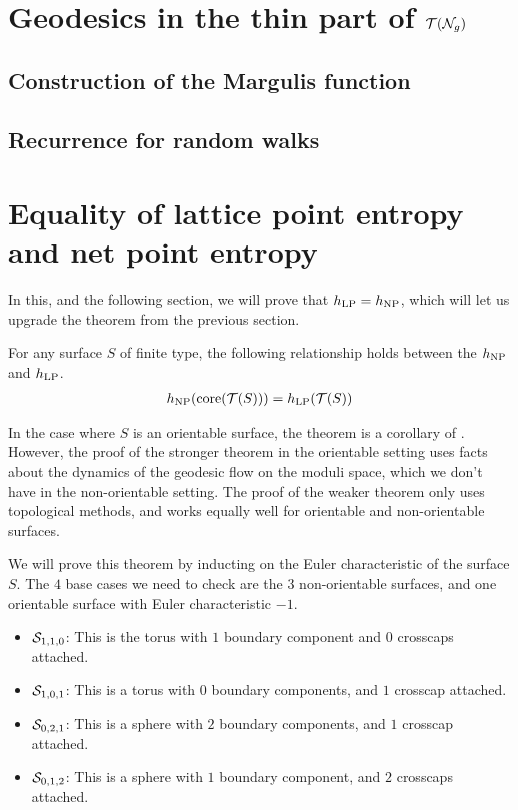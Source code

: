 \documentclass[12pt, reqno]{amsart}
\begin{document}
\section{Geodesics in the thin part of $\mathcal{T}(\mathcal{N}_g)$}
\label{sec:recurr-rand-walks}


\subsection{Construction of the Margulis function}
\label{sec:constr-marg-funct}

\subsection{Recurrence for random walks}
\label{sec:recurr-rand-walks-1}

\section{Equality of lattice point entropy and net point entropy}
\label{sec:equal-latt-point}


In this, and the following section, we will prove that $h_{\mathrm{LP}} = h_{\mathrm{NP}}$, which will let us upgrade the {\color{red} theorem from the previous section}.
\begin{theorem}
  \label{thm:entropy-equality}
  For any surface $S$ of finite type, the following relationship holds between the $h_{\mathrm{NP}}$ and $h_{\mathrm{LP}}$.
  \begin{align*}
    h_{\mathrm{NP}}(\mathrm{core}(\mathcal{T}(S))) = h_{\mathrm{LP}}(\mathcal{T}(S))
  \end{align*}
\end{theorem}

\begin{rem}
  In the case where $S$ is an orientable surface, the theorem is a corollary of \textcite[Theorem 1.2]{10.1215/00127094-1548443}.
  However, the proof of the stronger theorem in the orientable setting uses facts about the dynamics of the geodesic flow on the moduli space, which we don't have in the non-orientable setting.
  The proof of the weaker theorem only uses topological methods, and works equally well for orientable and non-orientable surfaces.
\end{rem}

We will prove this theorem by inducting on the Euler characteristic of the surface $S$.
The $4$ base cases we need to check are the $3$ non-orientable surfaces, and one orientable surface with Euler characteristic $-1$.
\begin{itemize}
\item $\mathcal{S}_{1,1,0}$: This is the torus with $1$ boundary component and $0$ crosscaps attached.
\item $\mathcal{S}_{1,0,1}$: This is a torus with $0$ boundary components, and $1$ crosscap attached.
\item $\mathcal{S}_{0,2,1}$: This is a sphere with $2$ boundary components, and $1$ crosscap attached.
\item $\mathcal{S}_{0,1,2}$: This is a sphere with $1$ boundary component, and $2$ crosscaps attached.
\end{itemize}
\end{document}
